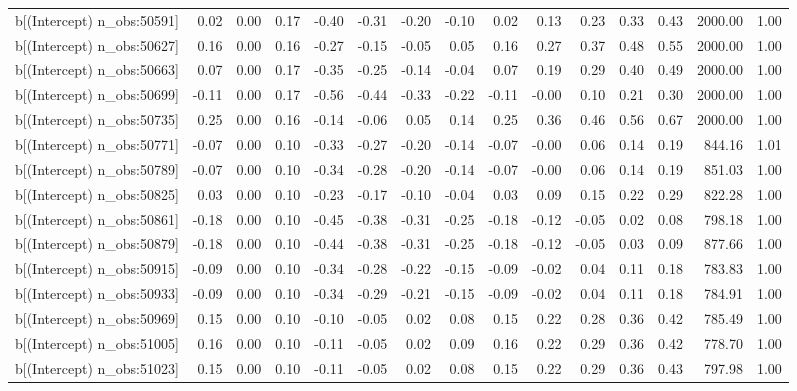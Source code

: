 \begin{table}[ht]
\begin{tabular}{rrrrrrrrrrrrrrr}
  b[(Intercept) n\_obs:50591] & 0.02 & 0.00 & 0.17 & -0.40 & -0.31 & -0.20 & -0.10 & 0.02 & 0.13 & 0.23 & 0.33 & 0.43 & 2000.00 & 1.00 \\ 
  b[(Intercept) n\_obs:50627] & 0.16 & 0.00 & 0.16 & -0.27 & -0.15 & -0.05 & 0.05 & 0.16 & 0.27 & 0.37 & 0.48 & 0.55 & 2000.00 & 1.00 \\ 
  b[(Intercept) n\_obs:50663] & 0.07 & 0.00 & 0.17 & -0.35 & -0.25 & -0.14 & -0.04 & 0.07 & 0.19 & 0.29 & 0.40 & 0.49 & 2000.00 & 1.00 \\ 
  b[(Intercept) n\_obs:50699] & -0.11 & 0.00 & 0.17 & -0.56 & -0.44 & -0.33 & -0.22 & -0.11 & -0.00 & 0.10 & 0.21 & 0.30 & 2000.00 & 1.00 \\ 
  b[(Intercept) n\_obs:50735] & 0.25 & 0.00 & 0.16 & -0.14 & -0.06 & 0.05 & 0.14 & 0.25 & 0.36 & 0.46 & 0.56 & 0.67 & 2000.00 & 1.00 \\ 
  b[(Intercept) n\_obs:50771] & -0.07 & 0.00 & 0.10 & -0.33 & -0.27 & -0.20 & -0.14 & -0.07 & -0.00 & 0.06 & 0.14 & 0.19 & 844.16 & 1.01 \\ 
  b[(Intercept) n\_obs:50789] & -0.07 & 0.00 & 0.10 & -0.34 & -0.28 & -0.20 & -0.14 & -0.07 & -0.00 & 0.06 & 0.14 & 0.19 & 851.03 & 1.00 \\ 
  b[(Intercept) n\_obs:50825] & 0.03 & 0.00 & 0.10 & -0.23 & -0.17 & -0.10 & -0.04 & 0.03 & 0.09 & 0.15 & 0.22 & 0.29 & 822.28 & 1.00 \\ 
  b[(Intercept) n\_obs:50861] & -0.18 & 0.00 & 0.10 & -0.45 & -0.38 & -0.31 & -0.25 & -0.18 & -0.12 & -0.05 & 0.02 & 0.08 & 798.18 & 1.00 \\ 
  b[(Intercept) n\_obs:50879] & -0.18 & 0.00 & 0.10 & -0.44 & -0.38 & -0.31 & -0.25 & -0.18 & -0.12 & -0.05 & 0.03 & 0.09 & 877.66 & 1.00 \\ 
  b[(Intercept) n\_obs:50915] & -0.09 & 0.00 & 0.10 & -0.34 & -0.28 & -0.22 & -0.15 & -0.09 & -0.02 & 0.04 & 0.11 & 0.18 & 783.83 & 1.00 \\ 
  b[(Intercept) n\_obs:50933] & -0.09 & 0.00 & 0.10 & -0.34 & -0.29 & -0.21 & -0.15 & -0.09 & -0.02 & 0.04 & 0.11 & 0.18 & 784.91 & 1.00 \\ 
  b[(Intercept) n\_obs:50969] & 0.15 & 0.00 & 0.10 & -0.10 & -0.05 & 0.02 & 0.08 & 0.15 & 0.22 & 0.28 & 0.36 & 0.42 & 785.49 & 1.00 \\ 
  b[(Intercept) n\_obs:51005] & 0.16 & 0.00 & 0.10 & -0.11 & -0.05 & 0.02 & 0.09 & 0.16 & 0.22 & 0.29 & 0.36 & 0.42 & 778.70 & 1.00 \\ 
  b[(Intercept) n\_obs:51023] & 0.15 & 0.00 & 0.10 & -0.11 & -0.05 & 0.02 & 0.08 & 0.15 & 0.22 & 0.29 & 0.36 & 0.43 & 797.98 & 1.00 \\ 

\end{tabular}
\end{table}
